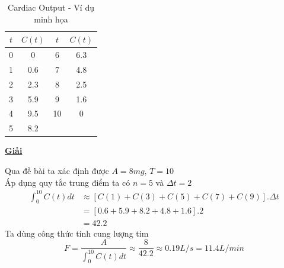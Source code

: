 \documentclass[12pt,a4paper]{article}
\begin{document}
\begin{enumerate}[a/]
\begin{flushleft}
\begin{table}[H]
			      \centering
			      \def\arraystretch{1.2}
			      \begin{tabular}{|c|c|c|c|}
				      \hline
				      $t$ & $C(t)$ & $t$ & $C(t)$ \\
				      \hline
				      0   & 0      & 6   & 6.3    \\
				      \hline
				      1   & 0.6    & 7   & 4.8    \\
				      \hline
				      2   & 2.3    & 8   & 2.5    \\
				      \hline
				      3   & 5.9    & 9   & 1.6    \\
				      \hline
				      4   & 9.5    & 10  & 0      \\
				      \hline
				      5   & 8.2    &     &        \\
				      \hline
			      \end{tabular}
				  \caption{Cardiac Output - Ví dụ minh họa}
		      \end{table}
	      \end{flushleft}
	      \newpage
	      \begin{center}
		      \textbf{\underline{Giải}}
	      \end{center}
	      \begin{flushleft}
		      Qua đề bài ta xác định được $A=8mg$, $T=10$\\
		      \vspace{1em}
		      Áp dụng quy tắc trung điểm ta có $n=5$ và $\Delta t=2$
		      \begin{align*}
			      \int_{0}^{10} C(t)dt & \approx \left[C(1)+C(3)+C(5)+C(7)+C(9)\right].\Delta t \\
			                           & =\left[0.6+5.9+8.2+4.8+1.6\right].2                    \\
			                           & =42.2
		      \end{align*}
		      Ta dùng công thức tính cung lượng tim
		      $$F=\frac{A}{\displaystyle \int_{0}^{10} C(t)dt} \approx \frac{8}{42.2} \approx 0.19L/s=11.4L/min$$
	      \end{flushleft}
\end{enumerate}

\newpage
{}
\end{document}
